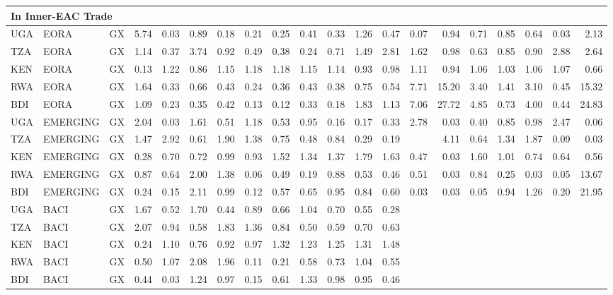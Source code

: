\documentclass[a4paper]{article}
\begin{document}
\begin{table}[ht]
{\begin{tabular}{lllrrrrrrrrrrrrrrrrr}
   \multicolumn{10}{l}{In Inner-EAC Trade} \\ \midrule
  UGA & EORA & GX & 5.74 & 0.03 & 0.89 & 0.18 & 0.21 & 0.25 & 0.41 & 0.33 & 1.26 & 0.47 & 0.07 & 0.94 & 0.71 & 0.85 & 0.64 & 0.03 & 2.13 \\ 
  TZA & EORA & GX & 1.14 & 0.37 & 3.74 & 0.92 & 0.49 & 0.38 & 0.24 & 0.71 & 1.49 & 2.81 & 1.62 & 0.98 & 0.63 & 0.85 & 0.90 & 2.88 & 2.64 \\ 
  KEN & EORA & GX & 0.13 & 1.22 & 0.86 & 1.15 & 1.18 & 1.18 & 1.15 & 1.14 & 0.93 & 0.98 & 1.11 & 0.94 & 1.06 & 1.03 & 1.06 & 1.07 & 0.66 \\ 
  RWA & EORA & GX & 1.64 & 0.33 & 0.66 & 0.43 & 0.24 & 0.36 & 0.43 & 0.38 & 0.75 & 0.54 & 7.71 & 15.20 & 3.40 & 1.41 & 3.10 & 0.45 & 15.32 \\ 
  BDI & EORA & GX & 1.09 & 0.23 & 0.35 & 0.42 & 0.13 & 0.12 & 0.33 & 0.18 & 1.83 & 1.13 & 7.06 & 27.72 & 4.85 & 0.73 & 4.00 & 0.44 & 24.83 \\ \midrule
     UGA & EMERGING & GX & 2.04 & 0.03 & 1.61 & 0.51 & 1.18 & 0.53 & 0.95 & 0.16 & 0.17 & 0.33 & 2.78 & 0.03 & 0.40 & 0.85 & 0.98 & 2.47 & 0.06 \\ 
  TZA & EMERGING & GX & 1.47 & 2.92 & 0.61 & 1.90 & 1.38 & 0.75 & 0.48 & 0.84 & 0.29 & 0.19 &  & 4.11 & 0.64 & 1.34 & 1.87 & 0.09 & 0.03 \\ 
  KEN & EMERGING & GX & 0.28 & 0.70 & 0.72 & 0.99 & 0.93 & 1.52 & 1.34 & 1.37 & 1.79 & 1.63 & 0.47 & 0.03 & 1.60 & 1.01 & 0.74 & 0.64 & 0.56 \\ 
  RWA & EMERGING & GX & 0.87 & 0.64 & 2.00 & 1.38 & 0.06 & 0.49 & 0.19 & 0.88 & 0.53 & 0.46 & 0.51 & 0.03 & 0.84 & 0.25 & 0.03 & 0.05 & 13.67 \\ 
  BDI & EMERGING & GX & 0.24 & 0.15 & 2.11 & 0.99 & 0.12 & 0.57 & 0.65 & 0.95 & 0.84 & 0.60 & 0.03 & 0.03 & 0.05 & 0.94 & 1.26 & 0.20 & 21.95 \\  \midrule
  UGA & BACI & GX & 1.67 & 0.52 & 1.70 & 0.44 & 0.89 & 0.66 & 1.04 & 0.70 & 0.55 & 0.28 &  &  &  &  &  &  &  \\ 
  TZA & BACI & GX & 2.07 & 0.94 & 0.58 & 1.83 & 1.36 & 0.84 & 0.50 & 0.59 & 0.70 & 0.63 &  &  &  &  &  &  &  \\ 
  KEN & BACI & GX & 0.24 & 1.10 & 0.76 & 0.92 & 0.97 & 1.32 & 1.23 & 1.25 & 1.31 & 1.48 &  &  &  &  &  &  &  \\ 
  RWA & BACI & GX & 0.50 & 1.07 & 2.08 & 1.96 & 0.11 & 0.21 & 0.58 & 0.73 & 1.04 & 0.55 &  &  &  &  &  &  &  \\ 
  BDI & BACI & GX & 0.44 & 0.03 & 1.24 & 0.97 & 0.15 & 0.61 & 1.33 & 0.98 & 0.95 & 0.46 &  &  &  &  &  &  &  \\ \midrule

\end{tabular}}
\end{table}
\end{document}
